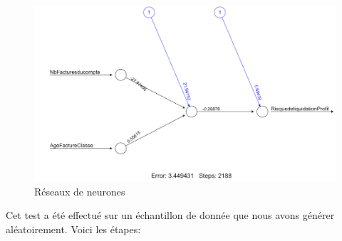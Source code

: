\documentclass[11pt,a4paper]{report}
\begin{document}
    \begin{figure}[h]
%
%
%
   
   \includegraphics[scale=0.45]{neural1.png}
     \caption{Réseaux de neurones}
     \label{figure18}
\end{figure}
Cet test a été effectué sur un échantillon de donnée que nous avons générer aléatoirement. Voici les étapes: 
\end{document}
